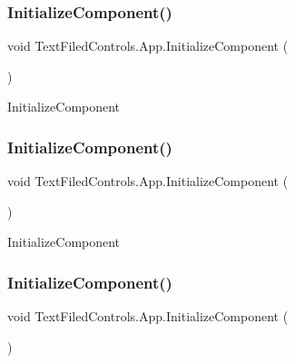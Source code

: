 \subsubsection{\texorpdfstring{Initialize\+Component()}{InitializeComponent()}\hspace{0.1cm}{\footnotesize\ttfamily [1/4]}}
{\footnotesize\ttfamily void Text\+Filed\+Controls.\+App.\+Initialize\+Component (\begin{DoxyParamCaption}{ }\end{DoxyParamCaption})}



Initialize\+Component 

\mbox{\label{class_text_filed_controls_1_1_app_a77dc852f132a2b9450aa443e2cb254af}} 
\subsubsection{\texorpdfstring{Initialize\+Component()}{InitializeComponent()}\hspace{0.1cm}{\footnotesize\ttfamily [2/4]}}
{\footnotesize\ttfamily void Text\+Filed\+Controls.\+App.\+Initialize\+Component (\begin{DoxyParamCaption}{ }\end{DoxyParamCaption})}



Initialize\+Component 

\mbox{\label{class_text_filed_controls_1_1_app_a77dc852f132a2b9450aa443e2cb254af}} 
\subsubsection{\texorpdfstring{Initialize\+Component()}{InitializeComponent()}\hspace{0.1cm}{\footnotesize\ttfamily [3/4]}}
{\footnotesize\ttfamily void Text\+Filed\+Controls.\+App.\+Initialize\+Component (\begin{DoxyParamCaption}{ }\end{DoxyParamCaption})}



